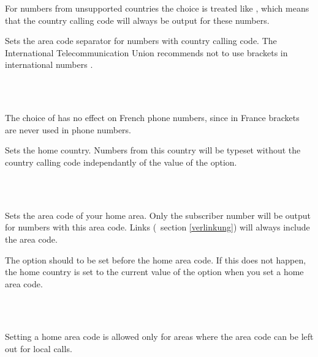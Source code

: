 \documentclass[numbers=noenddot]{scrreprt}
\newcommand*{\vglAbschnitt}[1]{(\cf\ section \ref{#1})}
\begin{document}
\begin{Befehlsliste}
For numbers from unsupported countries the choice
is treated like
, which means that the country calling code will always be output for these numbers.

Sets the area code separator for numbers with country calling code. The International Telecommunication Union recommends not to use brackets in international numbers \cite[3]{ITU-123}.

\begin{sidebyside}
   \\
   \\
\end{sidebyside}
The choice of
has no effect on French phone numbers, since in France brackets are never used in phone numbers.

Sets the home country. Numbers from this country will be typeset without the country calling code independantly of the value of the  option.
\begin{sidebyside}
   \\
   \\
\end{sidebyside}

Sets the area code of your home area. Only the subscriber number will be output for numbers with this area code. Links
\vglAbschnitt{verlinkung}
will always include the area code.

The  option should to be set before the home area code. If this does not happen, the home country is set to the current value of the  option when you set a home area code.
\begin{sidebyside}
   \\
   \\
\end{sidebyside}
Setting a home area code is allowed only for areas where the area code can be left out for local calls.
\end{Befehlsliste}
\end{document}
